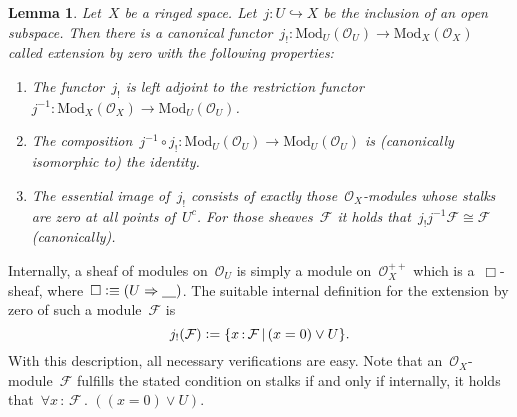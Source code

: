 \documentclass[10pt,reqno,a4paper]{amsbook}
\makeatletter
\theoremstyle{definition}
\theoremstyle{plain}
\newtheorem{lemma}[defn]{Lemma}
\theoremstyle{remark}
\newcommand{\F}{\mathcal{F}}
\renewcommand{\O}{\mathcal{O}}
\newcommand{\placeholder}{\underline{\quad}}
\newcommand{\Mod}{\mathrm{Mod}}
\newcommand{\?}{\,{:}\,}
\renewcommand{\_}{\mathpunct{.}\,}
\newcommand{\defeq}{\vcentcolon=}
\newcommand{\defequiv}{\vcentcolon\equiv}
\renewenvironment{proof}[1][\proofname]{\par
  \pushQED{\qed}%
  \normalfont \topsep6\p@\@plus6\p@\relax
  \trivlist
  \item[\hskip\labelsep
        \itshape
    #1\@addpunct{.}]\ignorespaces
}{%
  \popQED\endtrivlist\@endpefalse
}
\makeatother
\begin{document}
\begin{lemma}\label{lemma:extension-by-zero}
Let~$X$ be a ringed space. Let~$j : U \hookrightarrow X$ be the inclusion
of an open subspace. Then there is a canonical functor~$j_! : \Mod_U(\O_U) \to
\Mod_X(\O_X)$ called \emph{extension by zero} with the following properties:
\begin{enumerate}
\item The functor~$j_!$ is left adjoint to the restriction functor~$j^{-1} :
\Mod_X(\O_X) \to \Mod_U(\O_U)$.
\item The composition~$j^{-1} \circ j_! : \Mod_U(\O_U) \to \Mod_U(\O_U)$ is (canonically
isomorphic to) the identity.
\item The essential image of~$j_!$ consists of exactly those~$\O_X$-modules
whose stalks are zero at all points of~$U^c$. For those sheaves~$\F$ it holds
that~$j_!j^{-1}\F \cong \F$ (canonically).
\end{enumerate}
\end{lemma}
\begin{proof}Internally, a sheaf of modules on~$\O_U$ is simply a module
on~$\O_X^{++}$ which is a~$\Box$-sheaf, where~$\Box \defequiv (U \Rightarrow
\placeholder)$. The suitable internal definition for the extension by zero of
such a module~$\F$ is
\[ j_!(\F) \defeq \{ x\?\F \,|\, (x = 0) \vee U \}. \]
With this description, all necessary verifications are easy. Note that
an~$\O_X$-module~$\F$ fulfills the stated condition on stalks if and only if
internally, it holds that~$\forall x\?\F\_ ((x = 0) \vee U)$.
\end{proof}
\end{document}
